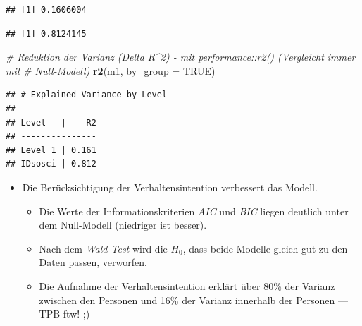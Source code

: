 \documentclass[
]{book}
\newenvironment{Shaded}{\begin{snugshade}}{\end{snugshade}}
\newcommand{\CommentTok}[1]{\textcolor[rgb]{0.56,0.35,0.01}{\textit{#1}}}
\newcommand{\DataTypeTok}[1]{\textcolor[rgb]{0.13,0.29,0.53}{#1}}
\newcommand{\DecValTok}[1]{\textcolor[rgb]{0.00,0.00,0.81}{#1}}
\newcommand{\KeywordTok}[1]{\textcolor[rgb]{0.13,0.29,0.53}{\textbf{#1}}}
\newcommand{\NormalTok}[1]{#1}
\newcommand{\OperatorTok}[1]{\textcolor[rgb]{0.81,0.36,0.00}{\textbf{#1}}}
\newcommand{\OtherTok}[1]{\textcolor[rgb]{0.56,0.35,0.01}{#1}}
\newcommand{\StringTok}[1]{\textcolor[rgb]{0.31,0.60,0.02}{#1}}
\providecommand{\tightlist}{%
  \setlength{\itemsep}{0pt}\setlength{\parskip}{0pt}}
\begin{document}
\begin{verbatim}
## [1] 0.1606004
\end{verbatim}

\begin{Shaded}
\end{Shaded}

\begin{verbatim}
## [1] 0.8124145
\end{verbatim}

\begin{Shaded}
\begin{Highlighting}[]
\CommentTok{# Reduktion der Varianz (Delta R^2) - mit performance::r2() (Vergleicht immer mit}
\CommentTok{# Null-Modell)}
\KeywordTok{r2}\NormalTok{(m1, }\DataTypeTok{by_group =} \OtherTok{TRUE}\NormalTok{)}
\end{Highlighting}
\end{Shaded}

\begin{verbatim}
## # Explained Variance by Level
## 
## Level   |    R2
## ---------------
## Level 1 | 0.161
## IDsosci | 0.812
\end{verbatim}

\begin{itemize}
\tightlist
\item
  Die Berücksichtigung der Verhaltensintention verbessert das Modell.

  \begin{itemize}
  \tightlist
  \item
    Die Werte der Informationskriterien \emph{AIC} und \emph{BIC} liegen deutlich unter dem Null-Modell (niedriger ist besser).
  \item
    Nach dem \emph{Wald-Test} wird die \(H_0\), dass beide Modelle gleich gut zu den Daten passen, verworfen.
  \item
    Die Aufnahme der Verhaltensintention erklärt über 80\% der Varianz zwischen den Personen und 16\% der Varianz innerhalb der Personen --- TPB ftw! ;)
  \end{itemize}
\end{itemize}
\end{document}
